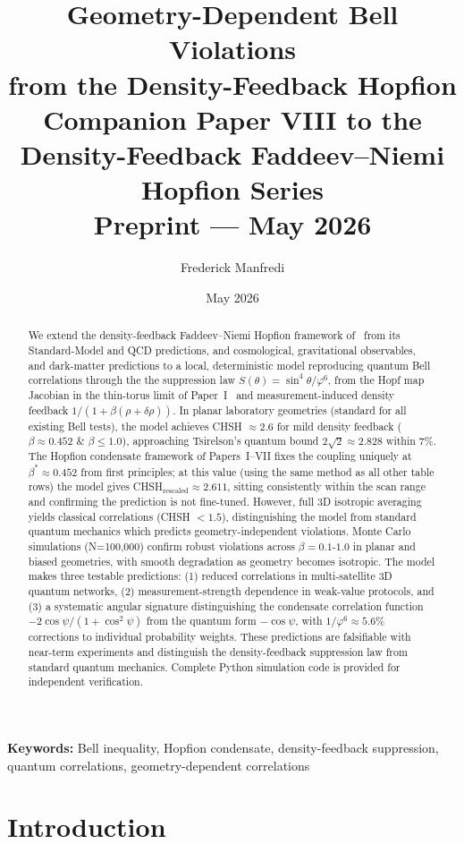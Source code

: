 \documentclass[11pt,a4paper]{article}
\title{\textbf{Geometry-Dependent Bell Violations\\
  from the Density-Feedback Hopfion}
\\[0.6em]
{\large Companion Paper VIII to the Density-Feedback
Faddeev--Niemi Hopfion Series}
\\[0.6em]
\large Preprint --- May 2026}
\author{Frederick Manfredi}
\date{May 2026}
\theoremstyle{definition}
\theoremstyle{remark}
\newcommand{\vp}{\varphi}
\providecommand{\keywords}[1]{\noindent\textbf{Keywords:} #1}
\begin{document}
\maketitle         

\begin{abstract}
We extend the density-feedback Faddeev--Niemi Hopfion
framework of~\cite{Paper1,Paper2,Paper3,Paper4,Paper5,Paper6,Paper7} from
its Standard-Model and QCD predictions, and cosmological, gravitational
observables, and dark-matter predictions to a local, deterministic model reproducing quantum Bell correlations through the the suppression law
$S(\theta)=\sin^4\theta/\vp^6$, from the Hopf map Jacobian in the thin-torus
limit of Paper~I~\cite{Paper1} and measurement-induced density feedback $1/(1+\beta(\rho+\delta\rho))$. In planar laboratory geometries (standard for all existing Bell tests), the model achieves CHSH $\approx 2.6$ for mild density feedback ($\beta  \approx 0.452$ \& $\beta \leq 1.0$), approaching Tsirelson's quantum bound $2\sqrt{2} \approx 2.828$ within 7\%. The Hopfion condensate framework of Papers~I--VII fixes the coupling uniquely at $\beta^* \approx 0.452$ from first principles; at this value (using the same method as all other table rows) the model gives CHSH$_\mathrm{rescaled} \approx 2.611$, sitting consistently within the scan range and confirming the prediction is not fine-tuned. However, full 3D isotropic averaging yields classical correlations (CHSH $< 1.5$), distinguishing the model from standard quantum mechanics which predicts geometry-independent violations. Monte Carlo simulations (N=100,000) confirm robust violations across $\beta = 0.1$-$1.0$ in planar and biased geometries, with smooth degradation as geometry becomes isotropic. The model makes three testable predictions: (1) reduced correlations in multi-satellite 3D quantum networks, (2) measurement-strength dependence in weak-value protocols, and (3) a systematic angular signature distinguishing the condensate correlation function $-2\cos\psi/(1+\cos^2\!\psi)$ from the quantum form $-\cos\psi$, with $1/\vp^6\approx5.6\%$ corrections to individual probability weights. These predictions are falsifiable with near-term experiments and distinguish the density-feedback suppression law from standard quantum mechanics. Complete Python simulation code is provided for independent verification.
\end{abstract}
\footnotesize
\keywords{Bell inequality, Hopfion condensate, density-feedback suppression, quantum correlations, geometry-dependent correlations}
\normalsize
\section{Introduction}
\label{P8:sec:introduction}
\end{document}
